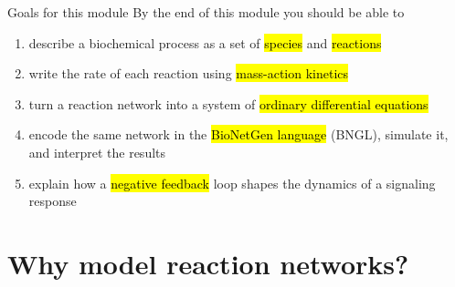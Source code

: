 \documentclass[aspectratio=169,10pt,t]{beamer}
\begin{document}
\begin{frame}{Goals for this module}
  By the end of this module you should be able to
  \begin{enumerate}[<+->]
    \setlength\itemsep{1.5mm}
    \item describe a biochemical process as a set of \hl{species} and \hl{reactions}
    \item write the rate of each reaction using \hl{mass-action kinetics}
    \item turn a reaction network into a system of \hl{ordinary differential equations}
    \item encode the same network in the \hl{BioNetGen language} (BNGL), simulate it,
          and interpret the results
    \item explain how a \hl{negative feedback} loop shapes the dynamics of a signaling response
  \end{enumerate}
\end{frame}

\section{Why model reaction networks?}
\end{document}
